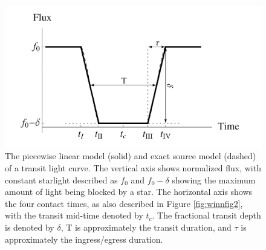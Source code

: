 \documentclass[oneside,12pt]{amsart}
\numberwithin{page}{section}
\begin{document}
\begin{figure}[htbp]
    \centering
    \includegraphics[width=0.8\linewidth]{figs/carter_fig1.png}
    \caption{The piecewise linear model (solid) and exact source model (dashed) of a transit light curve. The vertical axis shows normalized flux, with constant starlight described as $f_0$ and $f_0-\delta$ showing the maximum amount of light being blocked by a star. The horizontal axis shows the four contact times, as also described in Figure \ref{fig:winnfig2}, with the transit mid-time denoted by $t_c$. The fractional transit depth is denoted by $\delta$, T is approximately the transit duration, and $\tau$ is approximately the ingress/egress duration.}
    \label{fig:carter-fig1}
\end{figure}

\end{document}

